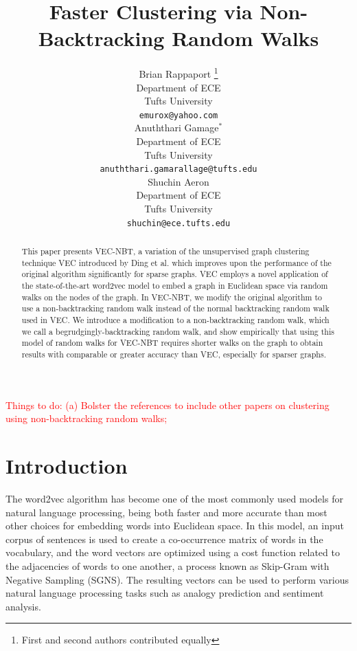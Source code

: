 \documentclass{article} %
\title{Faster Clustering via Non-Backtracking Random Walks}
\author{
Brian Rappaport \thanks{First and second authors contributed equally} \\
Department of ECE\\
Tufts University\\
\texttt{emurox@yahoo.com} \\
\And
Anuththari Gamage$^*$ \\
Department of ECE\\
Tufts University\\
\texttt{anuththari.gamarallage@tufts.edu} \\
\AND
Shuchin Aeron \\
Department of ECE\\
Tufts University\\
\texttt{shuchin@ece.tufts.edu} 
}
\begin{document}
\maketitle

\begin{abstract}
This paper presents VEC-NBT, a variation of the unsupervised graph clustering technique VEC introduced by Ding et al. \cite{NodeEmbed} which improves upon the performance of the original algorithm significantly for sparse graphs. VEC employs a novel application of the state-of-the-art word2vec model \cite{word2vec} to embed a graph in Euclidean space via random walks on the nodes of the graph. In VEC-NBT, we modify the original algorithm to use a non-backtracking random walk instead of the normal backtracking random walk used in VEC. We introduce a modification to a non-backtracking random walk, which we call a begrudgingly-backtracking random walk, and show empirically that using this model of random walks for VEC-NBT requires shorter walks on the graph to obtain results with comparable or greater accuracy than VEC, especially for sparser graphs.
\end{abstract}

\textcolor{red}{Things to do: (a) Bolster the references to include other papers on clustering using non-backtracking random walks;}

\section{Introduction}

The word2vec algorithm \cite{word2vec} has become one of the most commonly used models for natural language processing, being both faster and more accurate than most other choices for embedding words into Euclidean space. In this model, an input corpus of sentences is used to create a co-occurrence matrix of words in the vocabulary, and the word vectors are optimized using a cost function related to the adjacencies of words to one another, a process known as Skip-Gram with Negative Sampling (SGNS). The resulting vectors can be used to perform various natural language processing tasks such as analogy prediction and sentiment analysis.
\end{document}
